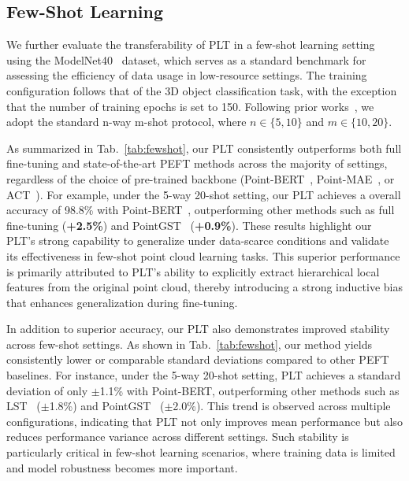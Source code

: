 

\subsection{Few-Shot Learning}
\label{sec:few_shot}

We further evaluate the transferability of PLT in a few-shot learning setting using the ModelNet40~\cite{wu20153d} dataset, which serves as a standard benchmark for assessing the efficiency of data usage in low-resource settings. The training configuration follows that of the 3D object classification task, with the exception that the number of training epochs is set to 150. Following prior works~\cite{zha2023instance, zhou2024dynamic}, we adopt the standard n-way m-shot protocol, where $n \in \{5, 10\}$ and $m \in \{10, 20\}$.

As summarized in Tab.~\ref{tab:fewshot}, our PLT consistently outperforms both full fine-tuning and state-of-the-art PEFT methods across the majority of settings, regardless of the choice of pre-trained backbone (Point-BERT~\cite{yu2022point}, Point-MAE~\cite{pang2022masked}, or ACT~\cite{dong2022autoencoders}). For example, under the 5-way 20-shot setting, our PLT achieves a overall accuracy of 98.8\% with Point-BERT~\cite{yu2022point}, outperforming other methods such as full fine-tuning (\textbf{+2.5\%}) and PointGST~\cite{liang2024parameter} (\textbf{+0.9\%}). These results highlight our PLT's strong capability to generalize under data-scarce conditions and validate its effectiveness in few-shot point cloud learning tasks. This superior performance is primarily attributed to PLT’s ability to explicitly extract hierarchical local features from the original point cloud, thereby introducing a strong inductive bias that enhances generalization during fine-tuning.

In addition to superior accuracy, our PLT also demonstrates improved stability across few-shot settings. As shown in Tab.~\ref{tab:fewshot}, our method yields consistently lower or comparable standard deviations compared to other PEFT baselines. For instance, under the 5-way 20-shot setting, PLT achieves a standard deviation of only $\pm$1.1\% with Point-BERT, outperforming other methods such as LST~\cite{sung2022lst} ($\pm$1.8\%) and PointGST~\cite{liang2024parameter} ($\pm$2.0\%). This trend is observed across multiple configurations, indicating that PLT not only improves mean performance but also reduces performance variance across different settings. Such stability is particularly critical in few-shot learning scenarios, where training data is limited and model robustness becomes more important.

